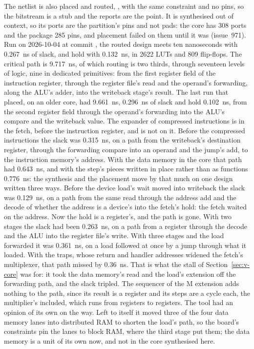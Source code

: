 \documentclass[journal,onecolumn,9pt]{IEEEtran}
\begin{document}
The netlist is also placed and routed, , with the same constraint and no pins,
so the bitstream is a stub and the reports are the point. It is
synthesised out of context, so its ports are the partition's pins
and not pads: the core has 308 ports and the package 285 pins, and placement failed on them until it was
(issue~971). Run on 2026-10-04 at commit , the routed
design meets ten nanoseconds with 0.267~ns of slack, and hold with
0.132~ns, in 2622 LUTs and 809 flip-flops. The critical path is
9.717~ns, of which routing is two thirds, through seventeen levels of
logic, nine in dedicated  primitives: from the first register field of the
instruction register, through the register file's read and the
operand's forwarding, along the ALU's adder, into the writeback
stage's result. The last run that placed, on an older core, had
9.661~ns, 0.296~ns of slack and hold 0.102~ns, from the second register field
through the operand's forwarding into the ALU's compare and the
writeback value.
The expander of compressed instructions is in the fetch, before the
instruction register, and is not on it. Before the compressed
instructions the slack was 0.315~ns, on a path from the writeback's
destination register, through the forwarding compare into an
operand and the jump's add, to the instruction memory's address.
With the data memory in the core that path had
0.643~ns, and with the step's pieces written in place rather than
as functions 0.776~ns: the synthesis and the placement move by that
much on one design written three ways. Before the device load's wait moved into
writeback the
slack was 0.129~ns, on a path from the same read through the
address add and the decode of whether the address is a device's
into the fetch's hold: the fetch waited on the address. Now the
hold is a register's, and the path is gone. With two stages the
slack had been 0.263~ns, on a path from a register through the
decode and the ALU into the register file's write. With three stages and the
load forwarded it was 0.361~ns, on a load followed at once by a jump
through what it loaded. With the traps, whose return and handler
addresses widened the fetch's multiplexer, that path missed by
0.36~ns. That is what the stall of Section~\ref{sec:v-core} was
for: it took the data memory's read and the load's extension off the
forwarding path, and the slack tripled. The sequencer of the M
extension adds nothing to the path, since its result is a register
and its steps are a cycle each, the multiplier's included, which
runs from registers to registers. The tool had an opinion of its own
on the way. Left to itself it moved three of the four data memory
lanes into distributed RAM to shorten the load's path, so the
board's constraints pin the lanes to block RAM, where the third stage
put them; the data memory is a unit of its own now, and not in the
core synthesised here.
\end{document}
